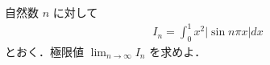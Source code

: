 \documentclass[../../main.tex]{subfiles}
\begin{document}
自然数 $n$ に対して
\begin{align}
  I_n = \int_0^1 x^2 |\sin n\pi x| dx
\end{align}
とおく．極限値 $\displaystyle \lim_{n \to \infty} I_n$ を求めよ．
\end{document}
